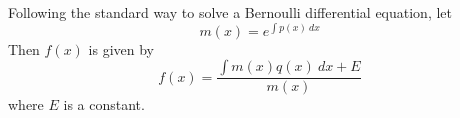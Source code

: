   Following the standard way to solve a Bernoulli differential equation,
  let
  \[
    m(x) = e^{\int p(x) \ dx}
  \]
  Then $f(x)$ is given by
  \[
    f(x) = \frac{\int m(x) q(x) \ dx + E }{m(x)}
  \]
  where $E$ is a constant.

